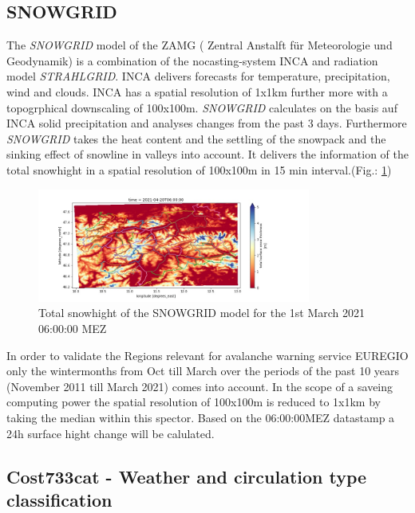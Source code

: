 \subsection{SNOWGRID}
The \textit{SNOWGRID} model of the ZAMG ( Zentral Anstalft für Meteorologie und Geodynamik)
 is a combination of the nocasting-system INCA and radiation model \textit{STRAHLGRID}. INCA delivers forecasts for
 temperature, precipitation, wind and clouds. INCA has a spatial resolution of 1x1km further more with a topogrphical
 downscaling of 100x100m. \textit{SNOWGRID} calculates on the basis auf INCA solid precipitation
 and analyses changes from the past 3 days. Furthermore \textit{SNOWGRID} takes the heat content and the settling of 
 the snowpack and the sinking effect of snowline in valleys into account. It delivers the information of the total
 snowhight in a spatial resolution of 100x100m in 15 min interval.(Fig.: \ref{fig:snowgrid})

 \begin{figure}[h]
    \centering
    \includegraphics[width=0.8\textwidth]{Figures/figures_methods/snowgrid.jpg}
    \caption{Total snowhight of the SNOWGRID model for the 1st March 2021 06:00:00 MEZ}
    \label{fig:snowgrid}
\end{figure}

\noindent In order to validate the Regions relevant for avalanche warning service EUREGIO only the wintermonths from Oct till March 
over the periods of the past 10 years (November 2011 till March 2021) comes into account. In the scope of a saveing computing 
power the spatial resolution of 100x100m is reduced to 1x1km by taking the median within this spector. 
Based on the 06:00:00MEZ datastamp a 24h surface hight change will be calulated.


\subsection{Cost733cat - Weather and circulation type classification}


